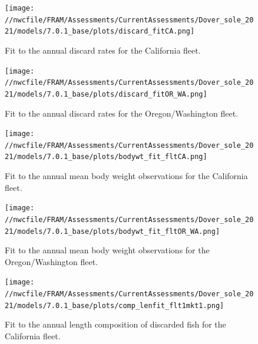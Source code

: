 \documentclass[11pt,
  english,
  a4paper,
]{article}
\begin{document}
\begin{figure}
\centering
\texttt{[image: //nwcfile/FRAM/Assessments/CurrentAssessments/Dover\_sole\_2021/models/7.0.1\_base/plots/discard\_fitCA.png]}
\caption{Fit to the annual discard rates for the California fleet.\label{fig:ca-disc-fit}}
\end{figure}

\tagmcend\tagstructend


\begin{figure}
\centering
\texttt{[image: //nwcfile/FRAM/Assessments/CurrentAssessments/Dover\_sole\_2021/models/7.0.1\_base/plots/discard\_fitOR\_WA.png]}
\caption{Fit to the annual discard rates for the Oregon/Washington fleet.\label{fig:orwa-disc-fit}}
\end{figure}

\tagmcend\tagstructend


\begin{figure}
\centering
\texttt{[image: //nwcfile/FRAM/Assessments/CurrentAssessments/Dover\_sole\_2021/models/7.0.1\_base/plots/bodywt\_fit\_fltCA.png]}
\caption{Fit to the annual mean body weight observations for the California fleet.\label{fig:ca-disc-mbw-fit}}
\end{figure}

\tagmcend\tagstructend


\begin{figure}
\centering
\texttt{[image: //nwcfile/FRAM/Assessments/CurrentAssessments/Dover\_sole\_2021/models/7.0.1\_base/plots/bodywt\_fit\_fltOR\_WA.png]}
\caption{Fit to the annual mean body weight observations for the Oregon/Washington fleet.\label{fig:orwa-disc-mbw-fit}}
\end{figure}

\tagmcend\tagstructend


\begin{figure}
\centering
\texttt{[image: //nwcfile/FRAM/Assessments/CurrentAssessments/Dover\_sole\_2021/models/7.0.1\_base/plots/comp\_lenfit\_flt1mkt1.png]}
\caption{Fit to the annual length composition of discarded fish for the California fleet.\label{fig:ca-disc-len-fit}}
\end{figure}
\end{document}
